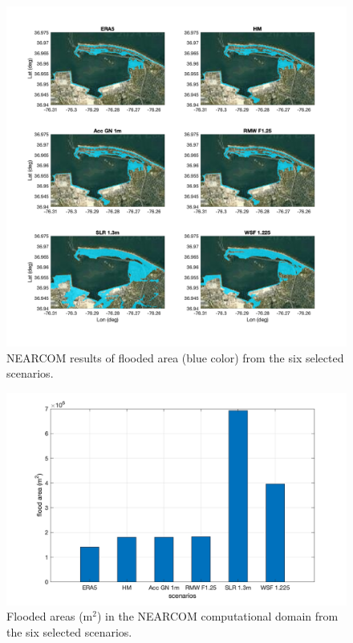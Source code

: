 \documentclass[preprint,12pt,authoryear] {elsarticle}
\begin{document}
\begin{figure}
\centering
\includegraphics[width=\textwidth]{./figures/nearcom_flood.jpg}
\caption{NEARCOM results of flooded area (blue color) from the six selected scenarios.}
\label{nearcom_6_cases_flood}
\centering
\end{figure}

\begin{figure}
\centering
\includegraphics[width=\textwidth]{./figures/nearcom_bars.jpg}
\caption{Flooded areas (m$^2$) in the NEARCOM computational domain from the six selected scenarios.}
\label{nearcom_bars}
\centering
\end{figure}
\end{document}
